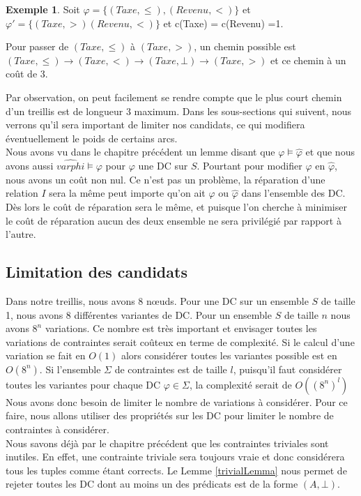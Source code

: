 \documentclass[letterpaper, 12pt]{report}
\theoremstyle{definition}
\newtheorem{myexample}{Exemple}
\begin{document}
\begin{myexample}
	Soit $\varphi = \{(Taxe,\leq),(Revenu,<) \}$ et $\varphi' = \{(Taxe,>)(Revenu,<) \}$ et c(Taxe) = c(Revenu) =1.
	
	Pour passer de $(Taxe,\leq)$ à $(Taxe,>)$, un chemin possible est $(Taxe,\leq) \rightarrow (Taxe,<) \rightarrow (Taxe,\bot) \rightarrow (Taxe,>)$ et ce chemin à un coût de 3.
\end{myexample}

Par observation, on peut facilement se rendre compte que le plus court chemin d'un treillis est de longueur 3 maximum. Dans les sous-sections qui suivent, nous verrons qu'il sera important de limiter nos candidats, ce qui modifiera éventuellement le poids de certains arcs.\\

Nous avons vu dans le chapitre précédent un lemme disant que $\varphi \models \hat{\varphi}$ et que nous avons aussi $\hat{varphi} \models \varphi$ pour $\varphi$ une DC sur $S$. Pourtant pour modifier $\varphi$ en $\hat{\varphi}$, nous avons un coût non nul. Ce n'est pas un problème, la réparation d'une relation $I$ sera la même peut importe qu'on ait $\varphi$ ou $\hat{\varphi}$ dans l'ensemble des DC. Dès lors le coût de réparation sera le même, et puisque l'on cherche à minimiser le coût de réparation aucun des deux ensemble ne sera privilégié par rapport à l'autre.

\subsection{Limitation des candidats}


Dans notre treillis, nous avons 8 nœuds. Pour une DC sur un ensemble $S$ de taille 1, nous avons 8 différentes variantes de DC. Pour un ensemble $S$ de taille $n$ nous avons $8^n$ variations. Ce nombre est très important et envisager toutes les variations de contraintes serait coûteux en terme de complexité. Si le calcul d'une variation se fait en $O(1)$ alors considérer toutes les variantes possible est en $O(8^n)$. Si l'ensemble $\Sigma$ de contraintes est de taille $l$, puisqu'il faut considérer toutes les variantes pour chaque DC $\varphi \in \Sigma$, la complexité serait de $O((8^n)^l)$ Nous avons donc besoin de limiter le nombre de variations à considérer. Pour ce faire, nous allons utiliser des propriétés sur les DC pour limiter le nombre de contraintes à considérer.\\

Nous savons déjà par le chapitre précédent que les contraintes triviales sont inutiles. En effet, une contrainte triviale sera toujours vraie et donc considérera tous les tuples comme étant corrects. Le Lemme \ref{trivialLemma} nous permet de rejeter toutes les DC dont au moins un des prédicats est de la forme $(A,\bot)$.\\
\end{document}
